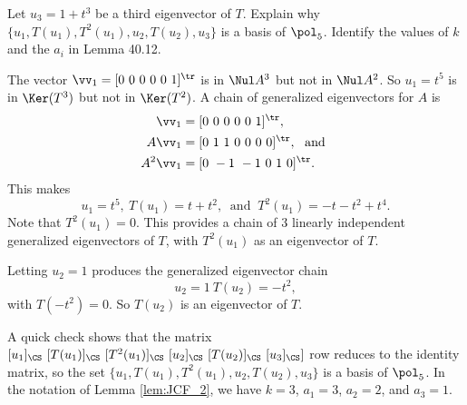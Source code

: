 \begin{activity}
\item Let $u_3 = 1+t^3$ be a third eigenvector of $T$. Explain why $\{u_1, T(u_1), T^2(u_1), u_2, T(u_2), u_3\}$ is a basis of $\pol_5$. Identify the values of $k$ and the $a_i$ in Lemma 40.12.

\ea

\end{activity} 

\ActivitySolution
\ba
\item The vector $\vv_1 = [0 \ 0 \ 0 \ 0 \ 0 \ 1]^{\tr}$ is in $\Nul A^3$ but not in $\Nul A^2$. So $u_1 = t^5$ is in $\Ker(T^3)$ but not in $\Ker(T^2)$. A chain of generalized eigenvectors for $A$ is
\begin{align*}
\vv_1&= [0 \ 0 \ 0 \ 0 \ 0 \ 1]^{\tr}, \\
A\vv_1 &= [0 \ 1 \ 1 \ 0 \ 0 \ 0 \ 0]^{\tr}, \ \text{ and } \\ 
A^2\vv_1 &= [0 \ -1 \ -1 \ 0 \ 1 \ 0]^{\tr}.
 \end{align*}
 This makes
 \[u_1 = t^5, \ T(u_1) = t+t^2, \ \text{ and } \ T^2(u_1) = -t-t^2+t^4.\]
 Note that $T^2(u_1) = 0$. This provides a chain of 3 linearly independent generalized eigenvectors of $T$, with $T^2(u_1)$ as an eigenvector of $T$. 

\item Letting $u_2 = 1$ produces the generalized eigenvector chain 
\[u_2 = 1 \ T(u_2) = -t^2,\]
with $T(-t^2) = 0$. So $T(u_2)$ is an eigenvector of $T$. 

\item A quick check shows that the matrix $[u_1]_{\CS} \ [T(u_1)]_{\CS} \ [T^2(u_1)]_{\CS} \ [u_2]_{\CS} \ [T(u_2)]_{\CS} \ [u_3]_{\CS}]$ row reduces to the identity matrix, so the set $\{u_1, T(u_1), T^2(u_1), u_2, T(u_2), u_3\}$ is a basis of $\pol_5$. In the notation of Lemma \ref{lem:JCF_2}, we have $k=3$, $a_1=3$, $a_2 = 2$, and $a_3 = 1$. 

\ea